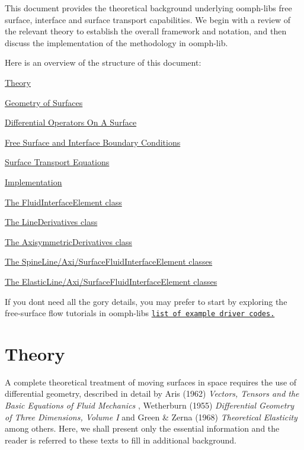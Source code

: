 This document provides the theoretical background underlying {\ttfamily oomph-\/lib\textquotesingle{}s} free surface, interface and surface transport capabilities. We begin with a review of the relevant theory to establish the overall framework and notation, and then discuss the implementation of the methodology in {\ttfamily oomph-\/lib}.

Here is an overview of the structure of this document\+:
\begin{DoxyItemize}
\item \hyperlink{index_theory}{Theory}
\begin{DoxyItemize}
\item \hyperlink{index_surface_representation}{Geometry of Surfaces}
\item \hyperlink{index_surface_gradient}{Differential Operators On A Surface}
\item \hyperlink{index_boundary_conditions}{Free Surface and Interface Boundary Conditions}
\item \hyperlink{index_surface_transport}{Surface Transport Equations}
\end{DoxyItemize}
\item \hyperlink{index_fs_implementation}{Implementation}
\begin{DoxyItemize}
\item \hyperlink{index_fluid_interface}{The Fluid\+Interface\+Element class}
\item \hyperlink{index_line}{The Line\+Derivatives class}
\item \hyperlink{index_axi}{The Axisymmetric\+Derivatives class}
\item \hyperlink{index_spine_formulation}{The Spine\+Line/\+Axi/\+Surface\+Fluid\+Interface\+Element classes}
\item \hyperlink{index_elastic_formulation}{The Elastic\+Line/\+Axi/\+Surface\+Fluid\+Interface\+Element classes}
\end{DoxyItemize}
\end{DoxyItemize}If you don\textquotesingle{}t need all the gory details, you may prefer to start by exploring the free-\/surface flow tutorials in {\ttfamily oomph-\/lib\textquotesingle{}s} \href{../../../example_code_list/html/index.html#free_surface_nst}{\tt list of example driver codes.}



 

\hypertarget{index_theory}{}\section{Theory}\label{index_theory}
A complete theoretical treatment of moving surfaces in space requires the use of differential geometry, described in detail by Aris (1962) {\itshape  Vectors, Tensors and the Basic Equations of Fluid Mechanics }, Wetherburn (1955) {\itshape  Differential Geometry of Three Dimensions, Volume I } and Green \& Zerna (1968) {\itshape  Theoretical Elasticity } among others. Here, we shall present only the essential information and the reader is referred to these texts to fill in additional background.



